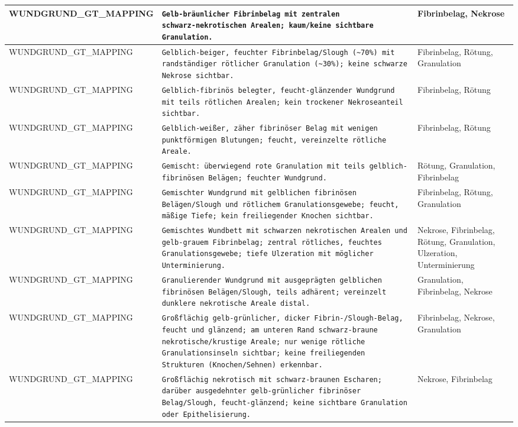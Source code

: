 \begin{longtable}{|p{3.5cm}|p{5cm}|p{6.5cm}|}
WUNDGRUND\_GT\_MAPPING & \texttt{Gelb‑bräunlicher Fibrinbelag mit zentralen schwarz‑nekrotischen Arealen; kaum/keine sichtbare Granulation.} & Fibrinbelag, Nekrose \\ \hline
WUNDGRUND\_GT\_MAPPING & \texttt{Gelblich-beiger, feuchter Fibrinbelag/Slough (\textasciitilde{}70\%) mit randständiger rötlicher Granulation (\textasciitilde{}30\%); keine schwarze Nekrose sichtbar.} & Fibrinbelag, Rötung, Granulation \\ \hline
WUNDGRUND\_GT\_MAPPING & \texttt{Gelblich-fibrinös belegter, feucht-glänzender Wundgrund mit teils rötlichen Arealen; kein trockener Nekroseanteil sichtbar.} & Fibrinbelag, Rötung \\ \hline
WUNDGRUND\_GT\_MAPPING & \texttt{Gelblich-weißer, zäher fibrinöser Belag mit wenigen punktförmigen Blutungen; feucht, vereinzelte rötliche Areale.} & Fibrinbelag, Rötung \\ \hline
WUNDGRUND\_GT\_MAPPING & \texttt{Gemischt: überwiegend rote Granulation mit teils gelblich-fibrinösen Belägen; feuchter Wundgrund.} & Rötung, Granulation, Fibrinbelag \\ \hline
WUNDGRUND\_GT\_MAPPING & \texttt{Gemischter Wundgrund mit gelblichen fibrinösen Belägen/Slough und rötlichem Granulationsgewebe; feucht, mäßige Tiefe; kein freiliegender Knochen sichtbar.} & Fibrinbelag, Rötung, Granulation \\ \hline
WUNDGRUND\_GT\_MAPPING & \texttt{Gemischtes Wundbett mit schwarzen nekrotischen Arealen und gelb-grauem Fibrinbelag; zentral rötliches, feuchtes Granulationsgewebe; tiefe Ulzeration mit möglicher Unterminierung.} & Nekrose, Fibrinbelag, Rötung, Granulation, Ulzeration, Unterminierung \\ \hline
WUNDGRUND\_GT\_MAPPING & \texttt{Granulierender Wundgrund mit ausgeprägten gelblichen fibrinösen Belägen/Slough, teils adhärent; vereinzelt dunklere nekrotische Areale distal.} & Granulation, Fibrinbelag, Nekrose \\ \hline
WUNDGRUND\_GT\_MAPPING & \texttt{Großflächig gelb‑grünlicher, dicker Fibrin-/Slough-Belag, feucht und glänzend; am unteren Rand schwarz‑braune nekrotische/krustige Areale; nur wenige rötliche Granulationsinseln sichtbar; keine freiliegenden Strukturen (Knochen/Sehnen) erkennbar.} & Fibrinbelag, Nekrose, Granulation \\ \hline
WUNDGRUND\_GT\_MAPPING & \texttt{Großflächig nekrotisch mit schwarz-braunen Escharen; darüber ausgedehnter gelb-grünlicher fibrinöser Belag/Slough, feucht-glänzend; keine sichtbare Granulation oder Epithelisierung.} & Nekrose, Fibrinbelag \\ \hline

\end{longtable}
